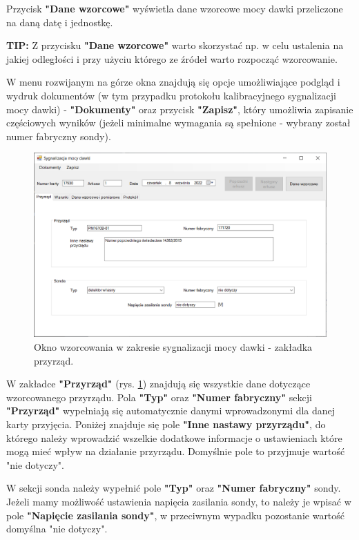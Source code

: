 	Przycisk \textbf{"Dane wzorcowe"} wyświetla dane wzorcowe mocy dawki przeliczone na daną datę i jednostkę.
	
	\textbf{TIP:} Z przycisku \textbf{"Dane wzorcowe"} warto skorzystać np. w celu ustalenia na jakiej odległości i przy użyciu którego ze źródeł warto rozpocząć wzorcowanie. 
	
	W menu rozwijanym na górze okna znajdują się opcje umożliwiające podgląd i wydruk dokumentów (w tym przypadku protokołu kalibracyjnego sygnalizacji mocy dawki) - \textbf{"Dokumenty"} oraz przycisk \textbf{"Zapisz"}, który umożliwia zapisanie częściowych wyników (jeżeli minimalne wymagania są spełnione - wybrany został numer fabryczny sondy).
	
	\begin{figure}[H]
		\centering
		\includegraphics[width=\columnwidth]{obrazki/Wzorcowanie/syg_mocy_dawki/przyrzad.png}
		\caption{Okno wzorcowania w zakresie sygnalizacji mocy dawki - zakładka przyrząd.}
		\label{sygMocyPrzyrzad}
	\end{figure}
	
	W zakładce \textbf{"Przyrząd"} (rys. \ref{sygMocyPrzyrzad}) znajdują się wszystkie dane dotyczące wzorcowanego przyrządu. Pola \textbf{"Typ"} oraz \textbf{"Numer fabryczny"} sekcji \textbf{"Przyrząd"} wypełniają się automatycznie danymi wprowadzonymi dla danej karty przyjęcia. Poniżej znajduje się pole \textbf{"Inne nastawy przyrządu"}, do którego należy wprowadzić wszelkie dodatkowe informacje o ustawieniach które mogą mieć wpływ na działanie przyrządu. Domyślnie pole to przyjmuje wartość "nie dotyczy".
	
	W sekcji sonda należy wypełnić pole \textbf{"Typ"} oraz \textbf{"Numer fabryczny"} sondy. Jeżeli mamy możliwość ustawienia napięcia zasilania sondy, to należy je wpisać w pole \textbf{"Napięcie zasilania sondy"}, w przeciwnym wypadku pozostanie wartość domyślna "nie dotyczy".
	
